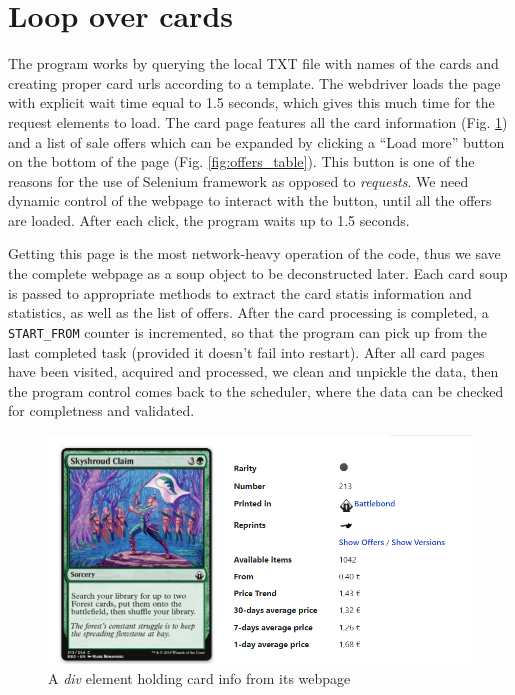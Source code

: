\section{Loop over cards}
The program works by querying the local TXT file with names of the cards and creating proper card urls according to a template. The webdriver loads the page with explicit wait time equal to 1.5 seconds, which gives this much time for the request elements to load. The card page features all the card information (Fig. \ref{fig:card_page}) and a list of sale offers which can be expanded by clicking a ``Load more'' button on the bottom of the page (Fig. \ref{fig:offers_table}). This button is one of the reasons for the use of Selenium framework as opposed to \textit{requests}. We need dynamic control of the webpage to interact with the button, until all the offers are loaded. After each click, the program waits up to 1.5 seconds. \par Getting this page is the most network-heavy operation of the code, thus we save the complete webpage as a soup object to be deconstructed later. Each card soup is passed to appropriate methods to extract the card statis information and statistics, as well as the list of offers. After the card processing is completed, a \texttt{START\_FROM} counter is incremented, so that the program can pick up from the last completed task (provided it doesn't fail into restart). After all card pages have been visited, acquired and processed, we clean and unpickle the data, then the program control comes back to the scheduler, where the data can be checked for completness and validated.

\begin{figure}
      \centering
      \includegraphics[width=\textwidth]{figures/card_page.png}
      \caption{A \textit{div} element holding card info from its webpage}
      \label{fig:card_page}
\end{figure}

